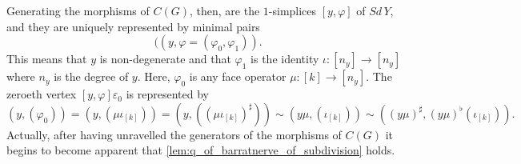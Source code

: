 Generating the morphisms of $C(G)$, then, are the $1$-simplices $[y,\varphi ]$ of $Sd\, Y$, and they are uniquely represented by minimal pairs
\[((y,\varphi =(\varphi _0,\varphi _1)).\]
This means that $y$ is non-degenerate and that $\varphi _1$ is the identity $\iota :[n_y]\to [n_y]$ where $n_y$ is the degree of $y$. Here, $\varphi _0$ is any face operator $\mu :[k]\to [n_y]$. The zeroeth vertex $[y,\varphi ]\varepsilon _0$ is represented by
\[(y,(\varphi _0))=(y,(\mu \iota _{[k]}))=(y,((\mu \iota _{[k]})^\sharp ))\sim (y\mu ,(\iota _{[k]}))\sim ((y\mu )^\sharp ,(y\mu )^\flat (\iota _{[k]})).\]
Actually, after having unravelled the generators of the morphisms of $C(G)$ it begins to become apparent that \cref{lem:q_of_barratnerve_of_subdivision} holds.


